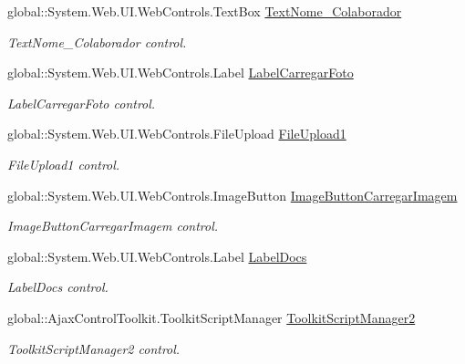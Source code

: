 \begin{DoxyCompactItemize}
global::System.Web.UI.WebControls.TextBox \hyperlink{class_sistema_r_h_1_1_cadastro_docs_a7aed86a72a29957d9e59a7d7a66eddf0}{TextNome\_\-Colaborador}
\begin{DoxyCompactList}\small\item\em TextNome\_\-Colaborador control. \item\end{DoxyCompactList}\item 
global::System.Web.UI.WebControls.Label \hyperlink{class_sistema_r_h_1_1_cadastro_docs_aa06556274477ad182494a5bed500f69f}{LabelCarregarFoto}
\begin{DoxyCompactList}\small\item\em LabelCarregarFoto control. \item\end{DoxyCompactList}\item 
global::System.Web.UI.WebControls.FileUpload \hyperlink{class_sistema_r_h_1_1_cadastro_docs_a6cb09b34eabc565682fdf585b60058c2}{FileUpload1}
\begin{DoxyCompactList}\small\item\em FileUpload1 control. \item\end{DoxyCompactList}\item 
global::System.Web.UI.WebControls.ImageButton \hyperlink{class_sistema_r_h_1_1_cadastro_docs_af52f4cd36a77912ec94cbc5a65c73459}{ImageButtonCarregarImagem}
\begin{DoxyCompactList}\small\item\em ImageButtonCarregarImagem control. \item\end{DoxyCompactList}\item 
global::System.Web.UI.WebControls.Label \hyperlink{class_sistema_r_h_1_1_cadastro_docs_af3a629db4b0544fe42def4930a20fe8f}{LabelDocs}
\begin{DoxyCompactList}\small\item\em LabelDocs control. \item\end{DoxyCompactList}\item 
global::AjaxControlToolkit.ToolkitScriptManager \hyperlink{class_sistema_r_h_1_1_cadastro_docs_a922507dd551a40cf6df9d74191dbe1f7}{ToolkitScriptManager2}
\begin{DoxyCompactList}\small\item\em ToolkitScriptManager2 control. \item\end{DoxyCompactList}\item 

\end{DoxyCompactItemize}
